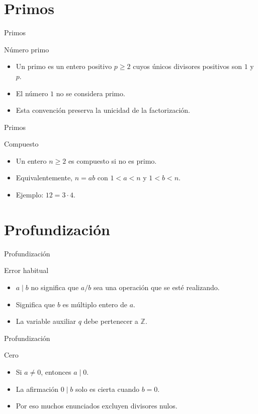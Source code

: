\documentclass[aspectratio=169,11pt]{beamer}
\begin{document}
\section{Primos}

\begin{frame}{Primos}
\begin{block}{Número primo}
\begin{itemize}
  \item Un primo es un entero positivo \(p\geq 2\) cuyos únicos divisores positivos son \(1\) y \(p\).
  \item El número \(1\) no se considera primo.
  \item Esta convención preserva la unicidad de la factorización.
\end{itemize}
\end{block}
\end{frame}

\begin{frame}{Primos}
\begin{block}{Compuesto}
\begin{itemize}
  \item Un entero \(n\geq 2\) es compuesto si no es primo.
  \item Equivalentemente, \(n=ab\) con \(1<a<n\) y \(1<b<n\).
  \item Ejemplo: \(12=3\cdot 4\).
\end{itemize}
\end{block}
\end{frame}

\section{Profundización}

\begin{frame}{Profundización}
\begin{block}{Error habitual}
\begin{itemize}
  \item \(a\mid b\) no significa que \(a/b\) sea una operación que se esté realizando.
  \item Significa que \(b\) es múltiplo entero de \(a\).
  \item La variable auxiliar \(q\) debe pertenecer a \(\mathbb{Z}\).
\end{itemize}
\end{block}
\end{frame}

\begin{frame}{Profundización}
\begin{block}{Cero}
\begin{itemize}
  \item Si \(a\neq 0\), entonces \(a\mid 0\).
  \item La afirmación \(0\mid b\) solo es cierta cuando \(b=0\).
  \item Por eso muchos enunciados excluyen divisores nulos.
\end{itemize}
\end{block}
\end{frame}
\end{document}
